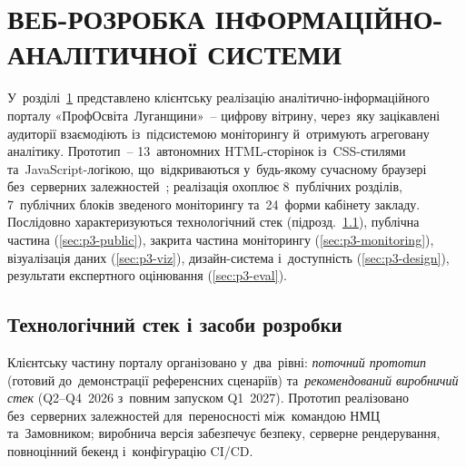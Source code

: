
\section{\texorpdfstring{\MakeUppercase{Веб-розробка інформаційно-аналітичної системи}}{Веб-розробка інформаційно-аналітичної системи}}
\label{sec:rozdil3}

У~розділі~\ref{sec:rozdil3} представлено клієнтську реалізацію аналітично-інформаційного порталу «ПрофОсвіта~Луганщини»~-- цифрову вітрину, через~яку зацікавлені аудиторії взаємодіють із~підсистемою моніторингу й~отримують агреговану аналітику. Прототип~-- 13~автономних HTML-сторінок із~CSS-стилями та~JavaScript-логікою, що~відкриваються у~будь-якому сучасному браузері без~серверних залежностей~\cite{NMTsPTO2025}; реалізація охоплює 8~публічних розділів, 7~публічних блоків зведеного моніторингу та~24~форми кабінету закладу. Послідовно характеризуються технологічний стек (підрозд.~\ref{sec:p3-stack}), публічна частина (\ref{sec:p3-public}), закрита частина моніторингу (\ref{sec:p3-monitoring}), візуалізація даних (\ref{sec:p3-viz}), дизайн-система і~доступність (\ref{sec:p3-design}), результати експертного оцінювання (\ref{sec:p3-eval}).

\subsection{Технологічний стек і засоби розробки}
\label{sec:p3-stack}

Клієнтську частину порталу організовано у~два~рівні: \emph{поточний прототип} (готовий до~демонстрації референсних сценаріїв) та~\emph{рекомендований виробничий стек} (Q2--Q4~2026 з~повним запуском Q1~2027). Прототип реалізовано без~серверних залежностей для~переносності між~командою НМЦ та~Замовником; виробнича версія забезпечує безпеку, серверне рендерування, повноцінний бекенд і~конфігурацію CI/CD.

